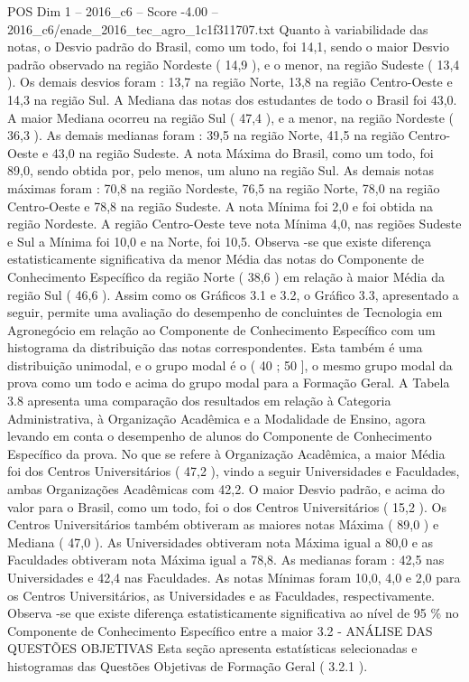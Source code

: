 \begin{textsample}{POS Dim 1 – 2016\_c6 – Score -4.00 – 2016\_c6/enade\_2016\_tec\_agro\_1c1f311707.txt}
Quanto à variabilidade das notas, o Desvio padrão do Brasil, como um todo, foi 14,1, sendo o maior Desvio padrão observado na região Nordeste ( 14,9 ), e o menor, na região Sudeste ( 13,4 ).
Os demais desvios foram : 13,7 na região Norte, 13,8 na região Centro-Oeste e 14,3 na região Sul.
A Mediana das notas dos estudantes de todo o Brasil foi 43,0.
A maior Mediana ocorreu na região Sul ( 47,4 ), e a menor, na região Nordeste ( 36,3 ).
As demais medianas foram : 39,5 na região Norte, 41,5 na região Centro-Oeste e 43,0 na região Sudeste.
A nota Máxima do Brasil, como um todo, foi 89,0, sendo obtida por, pelo menos, um aluno na região Sul.
As demais notas máximas foram : 70,8 na região Nordeste, 76,5 na região Norte, 78,0 na região Centro-Oeste e 78,8 na região Sudeste.
A nota Mínima foi 2,0 e foi obtida na região Nordeste.
A região Centro-Oeste teve nota Mínima 4,0, nas regiões Sudeste e Sul a Mínima foi 10,0 e na Norte, foi 10,5.
Observa -se que existe diferença estatisticamente significativa da menor Média das notas do Componente de Conhecimento Específico da região Norte ( 38,6 ) em relação à maior Média da região Sul ( 46,6 ).
Assim como os Gráficos 3.1 e 3.2, o Gráfico 3.3, apresentado a seguir, permite uma avaliação do desempenho de concluintes de Tecnologia em Agronegócio em relação ao Componente de Conhecimento Específico com um histograma da distribuição das notas correspondentes.
Esta também é uma distribuição unimodal, e o grupo modal é o ( 40 ; 50 ], o mesmo grupo modal da prova como um todo e acima do grupo modal para a Formação Geral.
A Tabela 3.8 apresenta uma comparação dos resultados em relação à Categoria Administrativa, à Organização Acadêmica e a Modalidade de Ensino, agora levando em conta o desempenho de alunos do Componente de Conhecimento Específico da prova.
No que se refere à Organização Acadêmica, a maior Média foi dos Centros Universitários ( 47,2 ), vindo a seguir Universidades e Faculdades, ambas Organizações Acadêmicas com 42,2.
O maior Desvio padrão, e acima do valor para o Brasil, como um todo, foi o dos Centros Universitários ( 15,2 ).
Os Centros Universitários também obtiveram as maiores notas Máxima ( 89,0 ) e Mediana ( 47,0 ).
As Universidades obtiveram nota Máxima igual a 80,0 e as Faculdades obtiveram nota Máxima igual a 78,8.
As medianas foram : 42,5 nas Universidades e 42,4 nas Faculdades.
As notas Mínimas foram 10,0, 4,0 e 2,0 para os Centros Universitários, as Universidades e as Faculdades, respectivamente.
Observa -se que existe diferença estatisticamente significativa ao nível de 95 \% no Componente de Conhecimento Específico entre a maior 3.2 - ANÁLISE DAS QUESTÕES OBJETIVAS Esta seção apresenta estatísticas selecionadas e histogramas das Questões Objetivas de Formação Geral ( 3.2.1 ).

\end{textsample}
